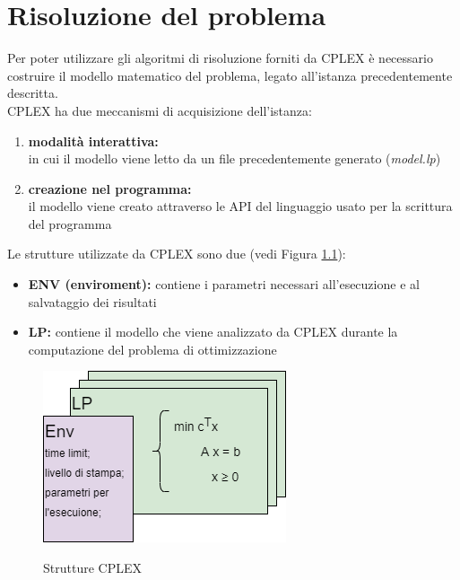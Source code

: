 \chapter{Risoluzione del problema}
Per poter utilizzare gli algoritmi di risoluzione forniti da CPLEX è necessario costruire il modello matematico del problema, legato all'istanza precedentemente descritta.\\
CPLEX ha due meccanismi di acquisizione dell'istanza:
\begin{enumerate}
\item{\textbf{modalità interattiva:}\\
in cui il modello viene letto da un file precedentemente generato (\textit{model.lp})}
\item{\textbf{creazione nel programma:}\\
il modello viene creato attraverso le API del linguaggio usato per la scrittura del programma}
\end{enumerate}

Le strutture utilizzate da CPLEX sono due (vedi Figura \ref{strutture_cplex}):
\begin{itemize}
\item{\textbf{ENV (enviroment):} contiene i parametri necessari all'esecuzione e al salvataggio dei risultati}
\item{\textbf{LP:} contiene il modello che viene analizzato da CPLEX durante la computazione del problema di ottimizzazione}
\end{itemize}

\begin{figure}[h] 
\begin{center} 
  \includegraphics[scale=0.7]{Images/cplex_structs}\\ 
  \caption{\footnotesize{Strutture CPLEX}}
  \label{strutture_cplex} 
\end{center} 
\end{figure}

